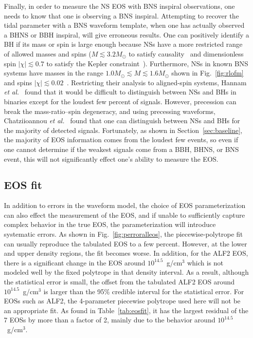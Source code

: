 \documentclass[twocolumn,prd,amssymb,aps,nofootinbib,showpacs,epsf]{revtex4}
\begin{document}
Finally, in order to measure the NS EOS with BNS inspiral observations, one needs to know that one is observing a BNS inspiral. Attempting to recover the tidal parameter with a BNS waveform template, when one has actually observed a BHNS or BBH inspiral, will give erroneous results. One can positively identify a BH if its mass or spin is large enough because NSs have a more restricted range of allowed masses and spins ($M \lesssim 3.2M_\odot$ to satisfy causality~\cite{RhoadesRuffini1974} and dimensionless spin $| \chi | \lesssim 0.7$ to satisfy the Kepler constraint~\cite{CookShapiroTeukolsky1994}). Furthermore, NSs in known BNS systems have masses in the range $1.0M_\odot \lesssim M \lesssim 1.6M_\odot$ shown in Fig.~\ref{fig:rlofm} and spins $|\chi| \lesssim 0.02$~\cite{Favata2014}.  Restricting their analysis to aligned-spin systems, Hannam {\it et al.}~\cite{HannamBrownFairhurst2013} found that it would be difficult to distinguish between NSs and BHs in binaries except for the loudest few percent of signals. However, precession can break the mass-ratio--spin degeneracy, and using precessing waveforms, Chatziioannou {\it et al.}~\cite{ChatziioannouCornishKlein2014} found that one can distinguish between NSs and BHs for the majority of detected signals. Fortunately, as shown in Section~\ref{sec:baseline}, the majority of EOS information comes from the loudest few events, so even if one cannot determine if the weakest signals come from a BBH, BHNS, or BNS event, this will not significantly effect one's ability to measure the EOS.

\subsection{EOS fit}
\label{sec:systematicEOS}

In addition to errors in the waveform model, the choice of EOS parameterization can also effect the measurement of the EOS, and if unable to sufficiently capture complex behavior in the true EOS, the parameterization will introduce systematic errors. As shown in Fig.~\ref{fig:perroralleos}, the piecewise-polytrope fit can usually reproduce the tabulated EOS to a few percent. However, at the lower and upper density regions, the fit becomes worse. In addition, for the ALF2 EOS, there is a significant change in the EOS around $10^{14.5}$~g/cm$^3$ which is not modeled well by the fixed polytrope in that density interval. As a result, although the statistical error is small, the offset from the tabulated ALF2 EOS around $10^{14.5}$~g/cm$^3$ is larger than the 95\% credible interval for the statistical error. For EOSs such as ALF2, the 4-parameter piecewise polytrope used here will not be an appropriate fit. As found in Table~\ref{tab:eosfit}, it has the largest residual of the 7 EOSs by more than a factor of 2, mainly due to the behavior around $10^{14.5}$~g/cm$^3$. 
\end{document}
